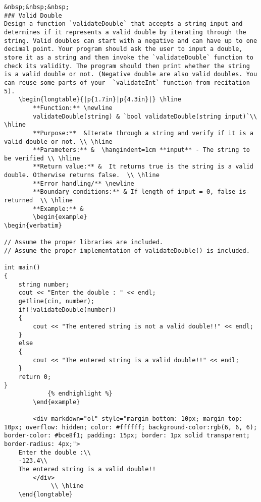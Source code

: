 \begin{problem}
\begin{verbatim}
&nbsp;&nbsp;&nbsp;
### Valid Double
Design a function `validateDouble` that accepts a string input and determines if it represents a valid double by iterating through the string. Valid doubles can start with a negative and can have up to one decimal point. Your program should ask the user to input a double, store it as a string and then invoke the `validateDouble` function to check its validity. The program should then print whether the string is a valid double or not. (Negative double are also valid doubles. You can reuse some parts of your  `validateInt` function from recitation 5).
    \begin{longtable}{|p{1.7in}|p{4.3in}|} \hline
        **Function:** \newline 
        validateDouble(string) & `bool validateDouble(string input)`\\ \hline
        **Purpose:**  &Iterate through a string and verify if it is a valid double or not. \\ \hline
        **Parameters:** &  \hangindent=1cm **input** - The string to be verified \\ \hline
        **Return value:** &  It returns true is the string is a valid double. Otherwise returns false.  \\ \hline
        **Error handling/** \newline
        **Boundary conditions:** & If length of input = 0, false is returned  \\ \hline
        **Example:** & 
        \begin{example}
\begin{verbatim}

// Assume the proper libraries are included.
// Assume the proper implementation of validateDouble() is included.

int main()
{
    string number;
    cout << "Enter the double : " << endl;
    getline(cin, number);
    if(!validateDouble(number))
    {
        cout << "The entered string is not a valid double!!" << endl;
    }
    else
    {
        cout << "The entered string is a valid double!!" << endl;
    }
    return 0;
}
            {% endhighlight %}
        \end{example}

        <div markdown="ol" style="margin-bottom: 10px; margin-top: 10px; overflow: hidden; color: #ffffff; background-color:rgb(6, 6, 6); border-color: #bce8f1; padding: 15px; border: 1px solid transparent; border-radius: 4px;">
    Enter the double :\\
    -123.4\\
    The entered string is a valid double!!
        </div>
             \\ \hline
    \end{longtable}


\end{verbatim}
\end{problem}
